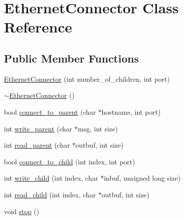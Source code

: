 \hypertarget{class_ethernet_connector}{\section{Ethernet\+Connector Class Reference}
\label{class_ethernet_connector}
}
\subsection*{Public Member Functions}
\begin{DoxyCompactItemize}
\item 
\hyperlink{class_ethernet_connector_ad9c57f606bb89e55c8b2b9a368ddb7d7}{Ethernet\+Connector} (int number\+\_\+of\+\_\+children, int port)
\item 
\hyperlink{class_ethernet_connector_a0e4bbc154a90b5215c677fc8934ddc41}{$\sim$\+Ethernet\+Connector} ()
\item 
bool \hyperlink{class_ethernet_connector_ac87a2cd96046fbf4576c3be120a38bdc}{connect\+\_\+to\+\_\+parent} (char $\ast$hostname, int port)
\item 
int \hyperlink{class_ethernet_connector_a5e3daf8069bf7fdc1ebc96d33c03dd62}{write\+\_\+parent} (char $\ast$msg, int size)
\item 
int \hyperlink{class_ethernet_connector_a7594171ffb3c6f4de4bdf32f9b9b56cc}{read\+\_\+parent} (char $\ast$outbuf, int size)
\item 
bool \hyperlink{class_ethernet_connector_a2cb599573bc7db2e92a9c22d302f58ea}{connect\+\_\+to\+\_\+child} (int index, int port)
\item 
int \hyperlink{class_ethernet_connector_a44b4142c65e12b9dba201a840b09a02b}{write\+\_\+child} (int index, char $\ast$inbuf, unsigned long size)
\item 
int \hyperlink{class_ethernet_connector_a5589ca816791a3b2dbce8a50e401b72e}{read\+\_\+child} (int index, char $\ast$outbuf, int size)
\item 
void \hyperlink{class_ethernet_connector_a76621c514770ab7702cf9881c719715c}{stop} ()
\end{DoxyCompactItemize}


